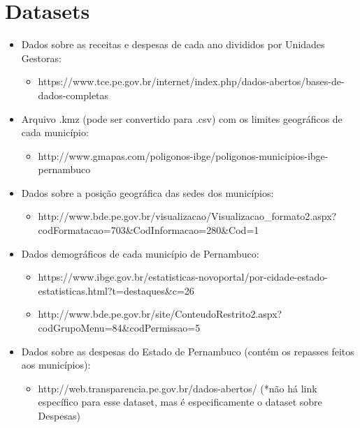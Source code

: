 \documentclass{article}
\begin{document}
\section{Datasets}
\begin{itemize}
    \item Dados sobre as receitas e despesas de cada ano divididos por Unidades Gestoras:
        \begin{itemize}
            \item https://www.tce.pe.gov.br/internet/index.php/dados-abertos/bases-de-dados-completas 
        \end{itemize}

    \item Arquivo .kmz (pode ser convertido para .csv) com os limites geográficos de cada município:
        \begin{itemize}
            \item http://www.gmapas.com/poligonos-ibge/poligonos-municipios-ibge-pernambuco
        \end{itemize}

    \item Dados sobre a posição geográfica das sedes dos municípios:
        \begin{itemize}
            \item http://www.bde.pe.gov.br/visualizacao/Visualizacao_formato2.aspx?codFormatacao=703&CodInformacao=280&Cod=1 
        \end{itemize}

    \item Dados demográficos de cada município de Pernambuco:
        \begin{itemize}
            \item https://www.ibge.gov.br/estatisticas-novoportal/por-cidade-estado-estatisticas.html?t=destaques&c=26 
            \item http://www.bde.pe.gov.br/site/ConteudoRestrito2.aspx?codGrupoMenu=84&codPermissao=5 
        \end{itemize}

    \item Dados sobre as despesas do Estado de Pernambuco (contém os repasses feitos aos municípios):
        \begin{itemize}
            \item http://web.transparencia.pe.gov.br/dados-abertos/   
            (*não há link específico para esse dataset, mas é especificamente o dataset sobre Despesas) 
        \end{itemize}
 \end{itemize}
\end{document}
